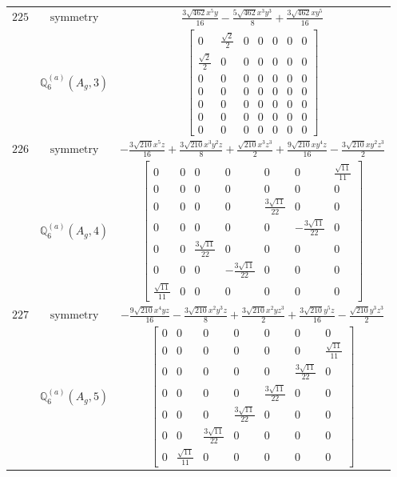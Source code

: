 \documentclass[fleqn,8pt,landscape]{jsarticle}
\begin{document}
\begin{longtable}{ccc}
$ 225 $ & $ \text{symmetry} $ & $ \frac{3 \sqrt{462} x^{5} y}{16} - \frac{5 \sqrt{462} x^{3} y^{3}}{8} + \frac{3 \sqrt{462} x y^{5}}{16} $ \\
$  $ & $ \mathbb{Q}_{6}^{(a)}(A_{g},3) $ & $ \begin{bmatrix} 0 & \frac{\sqrt{2}}{2} & 0 & 0 & 0 & 0 & 0 \\ \frac{\sqrt{2}}{2} & 0 & 0 & 0 & 0 & 0 & 0 \\ 0 & 0 & 0 & 0 & 0 & 0 & 0 \\ 0 & 0 & 0 & 0 & 0 & 0 & 0 \\ 0 & 0 & 0 & 0 & 0 & 0 & 0 \\ 0 & 0 & 0 & 0 & 0 & 0 & 0 \\ 0 & 0 & 0 & 0 & 0 & 0 & 0 \end{bmatrix} $ \\ \hline
$ 226 $ & $ \text{symmetry} $ & $ - \frac{3 \sqrt{210} x^{5} z}{16} + \frac{3 \sqrt{210} x^{3} y^{2} z}{8} + \frac{\sqrt{210} x^{3} z^{3}}{2} + \frac{9 \sqrt{210} x y^{4} z}{16} - \frac{3 \sqrt{210} x y^{2} z^{3}}{2} $ \\
$  $ & $ \mathbb{Q}_{6}^{(a)}(A_{g},4) $ & $ \begin{bmatrix} 0 & 0 & 0 & 0 & 0 & 0 & \frac{\sqrt{11}}{11} \\ 0 & 0 & 0 & 0 & 0 & 0 & 0 \\ 0 & 0 & 0 & 0 & \frac{3 \sqrt{11}}{22} & 0 & 0 \\ 0 & 0 & 0 & 0 & 0 & - \frac{3 \sqrt{11}}{22} & 0 \\ 0 & 0 & \frac{3 \sqrt{11}}{22} & 0 & 0 & 0 & 0 \\ 0 & 0 & 0 & - \frac{3 \sqrt{11}}{22} & 0 & 0 & 0 \\ \frac{\sqrt{11}}{11} & 0 & 0 & 0 & 0 & 0 & 0 \end{bmatrix} $ \\ \hline
$ 227 $ & $ \text{symmetry} $ & $ - \frac{9 \sqrt{210} x^{4} y z}{16} - \frac{3 \sqrt{210} x^{2} y^{3} z}{8} + \frac{3 \sqrt{210} x^{2} y z^{3}}{2} + \frac{3 \sqrt{210} y^{5} z}{16} - \frac{\sqrt{210} y^{3} z^{3}}{2} $ \\
$  $ & $ \mathbb{Q}_{6}^{(a)}(A_{g},5) $ & $ \begin{bmatrix} 0 & 0 & 0 & 0 & 0 & 0 & 0 \\ 0 & 0 & 0 & 0 & 0 & 0 & \frac{\sqrt{11}}{11} \\ 0 & 0 & 0 & 0 & 0 & \frac{3 \sqrt{11}}{22} & 0 \\ 0 & 0 & 0 & 0 & \frac{3 \sqrt{11}}{22} & 0 & 0 \\ 0 & 0 & 0 & \frac{3 \sqrt{11}}{22} & 0 & 0 & 0 \\ 0 & 0 & \frac{3 \sqrt{11}}{22} & 0 & 0 & 0 & 0 \\ 0 & \frac{\sqrt{11}}{11} & 0 & 0 & 0 & 0 & 0 \end{bmatrix} $ \\ \hline

\end{longtable}
\end{document}
